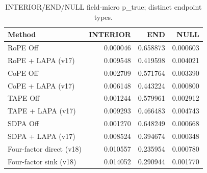 \begin{table}[t]
\centering
\scriptsize
\caption{INTERIOR/END/NULL field-micro p\_true; distinct endpoint types.}
\begin{tabular}{lrrr}
\toprule
Method & INTERIOR & END & NULL \\
\midrule
RoPE Off & 0.000046 & 0.658873 & 0.000603 \\
RoPE + LAPA (v17) & 0.009548 & 0.419598 & 0.004021 \\
CoPE Off & 0.002709 & 0.571764 & 0.003390 \\
CoPE + LAPA (v17) & 0.006148 & 0.443224 & 0.000800 \\
TAPE Off & 0.001244 & 0.579961 & 0.002912 \\
TAPE + LAPA (v17) & 0.009293 & 0.466483 & 0.004743 \\
SDPA Off & 0.001270 & 0.648249 & 0.000668 \\
SDPA + LAPA (v17) & 0.008524 & 0.394674 & 0.000348 \\
Four-factor direct (v18) & 0.010557 & 0.235954 & 0.000780 \\
Four-factor sink (v18) & 0.014052 & 0.290944 & 0.001770 \\
\bottomrule
\end{tabular}
\end{table}
